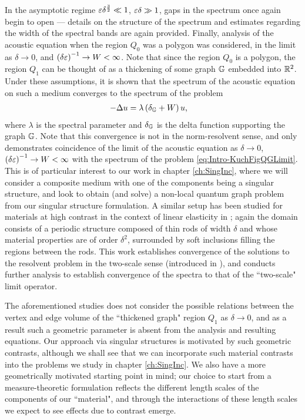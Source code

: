 In the asymptotic regime $\varepsilon\delta^{\frac{3}{2}}\ll 1$, $\varepsilon\delta\gg1$, gaps in the spectrum once again begin to open --- details on the structure of the spectrum and estimates regarding the width of the spectral bands are again provided.
Finally, analysis of the acoustic equation when the region $Q_0$ was a polygon \cite{figotin1998spectral} was considered, in the limit as $\delta\rightarrow0$, and $\left( \delta\varepsilon \right)^{-1}\rightarrow W<\infty$.
Note that since the region $Q_0$ is a polygon, the region $Q_1$ can be thought of as a thickening of some graph $\mathbb{G}$ embedded into $\mathbb{R}^2$.
Under these assumptions, it is shown that the spectrum of the acoustic equation on such a medium converges to the spectrum of the problem
\begin{align} \label{eq:Intro-KuchFigQGLimit}
	-\Delta u &= \lambda\left( \delta_{\mathbb{G}} + W \right)u,
\end{align}
where $\lambda$ is the spectral parameter and $\delta_{\mathbb{G}}$ is the delta function supporting the graph $\mathbb{G}$.
Note that this convergence is not in the norm-resolvent sense, and only demonstrates coincidence of the limit of the acoustic equation as $\delta\rightarrow0$, $\left( \delta\varepsilon \right)^{-1}\rightarrow W<\infty$ with the spectrum of the problem \eqref{eq:Intro-KuchFigQGLimit}.
This is of particular interest to our work in chapter \ref{ch:SingInc}, where we will consider a composite medium with one of the components being a singular structure, and look to obtain (and solve) a non-local quantum graph problem from our singular structure formulation.
A similar setup has been studied for materials at high contrast in the context of linear elasticity in \cite{cherednichenko2016homogenisation}; again the domain consists of a periodic structure composed of thin rods of width $\delta$ and whose material properties are of order $\delta^2$, surrounded by soft inclusions filling the regions between the rods.
This work establishes convergence of the solutions to the resolvent problem in the two-scale sense (introduced in \cite{zhikov2000extension}), and conducts further analysis to establish convergence of the spectra to that of the ``two-scale" limit operator.

The aforementioned studies does not consider the possible relations between the vertex and edge volume of the ``thickened graph" region $Q_1$ as $\delta\rightarrow0$, and as a result such a geometric parameter is absent from the analysis and resulting equations.
Our approach via singular structures is motivated by such geometric contrasts, although we shall see that we can incorporate such material contrasts into the problems we study in chapter \ref{ch:SingInc}.
We also have a more geometrically motivated starting point in mind; our choice to start from a measure-theoretic formulation reflects the different length scales of the components of our ``material", and through the interactions of these length scales we expect to see effects due to contrast emerge.